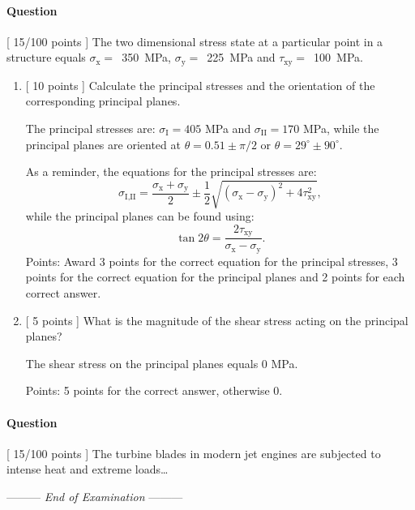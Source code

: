 \documentclass[a4paper,12pt,fleqn]{article}
\newcounter{question}
\newcommand*\question{%
  \stepcounter{question}%
  \paragraph{Question \thequestion}}
\newcommand{\lastwords}{End of Examination}
\begin{document}
\question [ 15/100 points ] The two dimensional stress state at a
particular point in a structure equals \mbox{$\sigma_{\text{x}} =$ 350
  MPa}, \mbox{$\sigma_{\text{y}} =$ 225 MPa} and
\mbox{$\tau_{\text{xy}} =$ 100 MPa}.
\begin{enumerate}
\item{} [ 10 points ] Calculate the principal stresses and the
  orientation of the corresponding principal planes.
  \begin{answer}
    The principal stresses are: $\sigma_{\textrm{I}} = 405$ MPa and
    $\sigma_{\textrm{II}} = 170$ MPa, while the principal planes are
    oriented at $\theta = 0.51 \pm \pi/2$ or
    $\theta = 29^{\circ} \pm 90^{\circ}$.

    As a reminder, the equations for the principal stresses are:
    \begin{equation*}
      \sigma_{\textrm{I,II}} = \frac{\sigma_{\textrm{x}} + \sigma_{\textrm{y}}}{2} \pm
      \frac{1}{2}\sqrt{(\sigma_{\textrm{x}} - \sigma_{\textrm{y}})^2 + 4\tau^2_{\textrm{xy}}},
    \end{equation*}
    while the principal planes can be found using:
    \begin{equation*}
      \tan 2\theta = \frac{2\tau_{\textrm{xy}}}{\sigma_{\textrm{x}} - \sigma_{\textrm{y}}}.
    \end{equation*}
    Points: Award 3 points for the correct equation for the principal
    stresses, 3 points for the correct equation for the principal
    planes and 2 points for each correct answer.
  \end{answer}
\item{} [ 5 points ] What is the magnitude of the shear stress
  acting on the principal planes?
  \begin{answer}
    The shear stress on the principal planes equals 0 MPa.

    Points: 5 points for the correct answer, otherwise 0.
  \end{answer}
\end{enumerate}

\question [ 15/100 points ] The turbine blades in modern jet engines are
subjected to intense heat and extreme loads\ldots

\begin{center}
\vspace{3cm}
--------- \textit{\lastwords} ---------
\end{center}

\label{finalpage}
\end{document}
